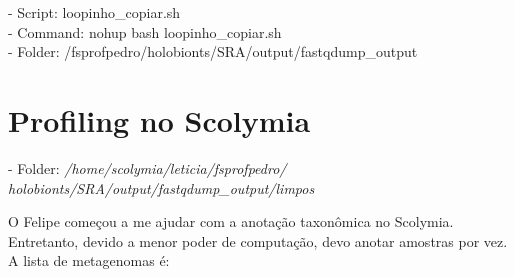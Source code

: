 \documentclass[12pt, a4paper]{report}
\begin{document}
\begin{tcolorbox}[width=6.3in]
	- Script: loopinho\_copiar.sh\\
	- Command: nohup bash loopinho\_copiar.sh\\
	- Folder: /fsprofpedro/holobionts/SRA/output/fastqdump\_output
\end{tcolorbox}

\section{Profiling no Scolymia}
\begin{tcolorbox}[width=6.3in]
	- Folder: \textit{/home/scolymia/leticia/fsprofpedro/\\holobionts/SRA/output/fastqdump\_output/limpos}
\end{tcolorbox}
O Felipe começou a me ajudar com a anotação taxonômica no Scolymia. Entretanto, devido a menor poder de computação, devo anotar amostras por vez. A lista de metagenomas é: 
\end{document}
